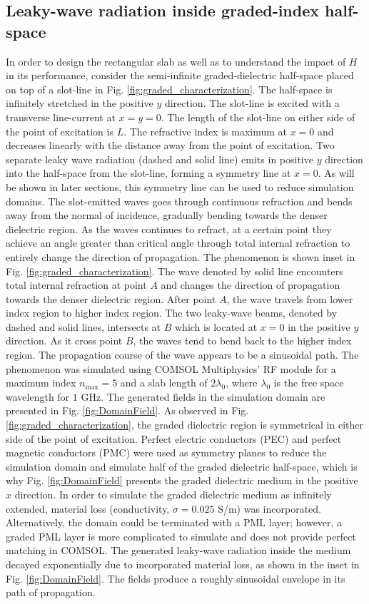 \subsection{Leaky-wave radiation inside graded-index half-space}
In order to design the rectangular slab as well as to understand the impact of $H$ in its performance, consider the semi-infinite graded-dielectric half-space placed on top of a slot-line in Fig. \ref{fig:graded_characterization}. The half-space is infinitely stretched in the positive $y$ direction. The slot-line is excited with a transverse line-current at $x=y=0$. The length of the slot-line on either side of the point of excitation is $L$. The refractive index is maximum at $x=0$ and decreases linearly with the distance away from the point of excitation. Two separate leaky wave radiation (dashed and solid line) emits in positive $y$ direction into the half-space from the slot-line, forming a symmetry line at $x=0$. As will be shown in later sections, this symmetry line can be used to reduce simulation domains. The slot-emitted waves goes through continuous refraction and bends away from the normal of incidence, gradually bending towards the denser dielectric region. As the waves continues to refract, at a certain point they achieve an angle greater than critical angle through total internal refraction to entirely change the direction of propagation. The phenomenon is shown inset in Fig. \ref{fig:graded_characterization}. The wave denoted by solid line encounters total internal refraction at point $A$ and changes the direction of propagation towards the denser dielectric region. After point $A$, the wave travels from lower index region to higher index region. The two leaky-wave beams, denoted by dashed and solid lines, intersects at $B$ which is located at $x=0$ in the positive $y$ direction. As it cross point $B$, the waves tend to bend back to the higher index region. The propagation course of the wave appears to be a sinusoidal path. The phenomenon was simulated using COMSOL Multiphysics' RF module for a maximum index $n_{\mathrm{max}} = 5$ and a slab length of $2 \lambda_0$, where $\lambda_0$ is the free space wavelength for $1$ GHz. The generated fields in the simulation domain are presented in Fig. \ref{fig:DomainField}. As observed in Fig. \ref{fig:graded_characterization}, the graded dielectric region is symmetrical in either side of the point of excitation. Perfect electric conductors (PEC) and perfect magnetic conductors (PMC) were used as symmetry planes to reduce the simulation domain and simulate half of the graded dielectric half-space, which is why Fig. \ref{fig:DomainField} presents the graded dielectric medium in the positive $x$ direction. In order to simulate the graded dielectric medium as infinitely extended, material loss (conductivity, $\sigma = 0.025$ S/m) was incorporated. Alternatively, the domain could be terminated with a PML layer; however, a graded PML layer is more complicated to simulate and does not provide perfect matching in COMSOL. The generated leaky-wave radiation inside the medium decayed exponentially due to incorporated material loss, as shown in the inset in Fig. \ref{fig:DomainField}. The fields produce a roughly sinusoidal envelope in its path of propagation.


